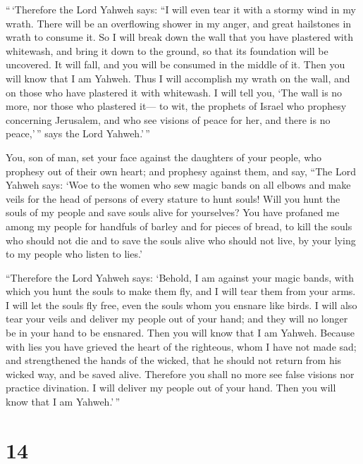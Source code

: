  ``\,`Therefore the Lord Yahweh says: ``I will even tear
it with a stormy wind in my wrath. There will be an overflowing shower
in my anger, and great hailstones in wrath to consume it.
 So I will break down the wall that you have plastered
with whitewash, and bring it down to the ground, so that its foundation
will be uncovered. It will fall, and you will be consumed in the middle
of it. Then you will know that I am Yahweh.  Thus I will
accomplish my wrath on the wall, and on those who have plastered it with
whitewash. I will tell you, `The wall is no more, nor those who
plastered it---  to wit, the prophets of Israel who
prophesy concerning Jerusalem, and who see visions of peace for her, and
there is no peace,'\,'' says the Lord Yahweh.'\,''

 You, son of man, set your face against the daughters of
your people, who prophesy out of their own heart; and prophesy against
them,  and say, ``The Lord Yahweh says: `Woe to the women
who sew magic bands on all elbows and make veils for the head of persons
of every stature to hunt souls! Will you hunt the souls of my people and
save souls alive for yourselves?  You have profaned me
among my people for handfuls of barley and for pieces of bread, to kill
the souls who should not die and to save the souls alive who should not
live, by your lying to my people who listen to lies.'

 ``Therefore the Lord Yahweh says: `Behold, I am against
your magic bands, with which you hunt the souls to make them fly, and I
will tear them from your arms. I will let the souls fly free, even the
souls whom you ensnare like birds.  I will also tear your
veils and deliver my people out of your hand; and they will no longer be
in your hand to be ensnared. Then you will know that I am Yahweh.
 Because with lies you have grieved the heart of the
righteous, whom I have not made sad; and strengthened the hands of the
wicked, that he should not return from his wicked way, and be saved
alive.  Therefore you shall no more see false visions nor
practice divination. I will deliver my people out of your hand. Then you
will know that I am Yahweh.'\,''

\hypertarget{section-12}{%
\section{14}\label{section-12}}

